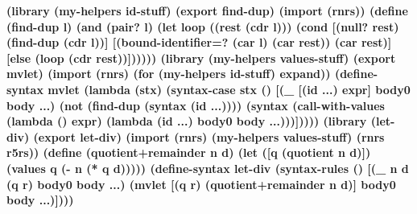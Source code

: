 {%
\renewcommand{\baselinestretch}{1.04}
\selectfont
\begin{schemenoindent}
\bfseries (library (my-helpers id-stuff)
\bfseries   (export find-dup)
\bfseries   (import (rnrs))
\bfseries
\bfseries   (define (find-dup l)
\bfseries     (and (pair? l)
\bfseries          (let loop ((rest (cdr l)))
\bfseries            (cond
\bfseries             [(null? rest) (find-dup (cdr l))]
\bfseries             [(bound-identifier=? (car l) (car rest))
\bfseries              (car rest)]
\bfseries             [else (loop (cdr rest))])))))
\bfseries
\bfseries (library (my-helpers values-stuff)
\bfseries   (export mvlet)
\bfseries   (import (rnrs) (for (my-helpers id-stuff) expand))
\bfseries
\bfseries   (define-syntax mvlet
\bfseries     (lambda (stx)
\bfseries       (syntax-case stx ()
\bfseries         [(\_ [(id ...) expr] body0 body ...)
\bfseries          (not (find-dup (syntax (id ...))))
\bfseries          (syntax
\bfseries            (call-with-values
\bfseries                (lambda () expr)
\bfseries              (lambda (id ...) body0 body ...)))]))))
\bfseries
\bfseries (library (let-div)
\bfseries   (export let-div)
\bfseries   (import (rnrs)
\bfseries           (my-helpers values-stuff)
\bfseries           (rnrs r5rs))
\bfseries
\bfseries   (define (quotient+remainder n d)
\bfseries     (let ([q (quotient n d)])
\bfseries       (values q (- n (* q d)))))
\bfseries   (define-syntax let-div
\bfseries     (syntax-rules ()
\bfseries      [(\_ n d (q r) body0 body ...)
\bfseries       (mvlet [(q r) (quotient+remainder n d)]
\bfseries         body0 body ...)])))%
\end{schemenoindent}

}

